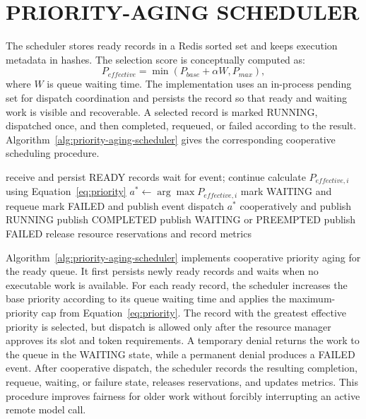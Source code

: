 \section{\uppercase{Priority-Aging Scheduler}}
The scheduler stores ready records in a Redis sorted set and keeps execution metadata in hashes. The selection score is conceptually computed as:
\begin{equation}
P_{effective}=\min(P_{base}+\alpha W,P_{max}),
\label{eq:priority}
\end{equation}
where $W$ is queue waiting time. The implementation uses an in-process pending set for dispatch coordination and persists the record so that ready and waiting work is visible and recoverable. A selected record is marked RUNNING, dispatched once, and then completed, requeued, or failed according to the result. Algorithm~\ref{alg:priority-aging-scheduler} gives the corresponding cooperative scheduling procedure.

\begin{algorithm}[H]
\caption{Global Priority-Aging Cooperative Scheduler}
\label{alg:priority-aging-scheduler}
\begin{algorithmic}[1]
\State receive and persist READY records
 wait for event; continue \EndIf
{} calculate $P_{effective,i}$ using Equation~\ref{eq:priority} \EndFor
\State $a^* \gets \arg\max P_{effective,i}$
 mark WAITING and requeue
 mark FAILED and publish event
\Else dispatch $a^*$ cooperatively and publish RUNNING
 publish COMPLETED
 publish WAITING or PREEMPTED
\Else publish FAILED
\EndIf
\EndIf
\State release resource reservations and record metrics
\EndWhile
\end{algorithmic}
\end{algorithm}
Algorithm~\ref{alg:priority-aging-scheduler} implements cooperative priority aging for the ready queue. It first persists newly ready records and waits when no executable work is available. For each ready record, the scheduler increases the base priority according to its queue waiting time and applies the maximum-priority cap from Equation~\ref{eq:priority}. The record with the greatest effective priority is selected, but dispatch is allowed only after the resource manager approves its slot and token requirements. A temporary denial returns the work to the queue in the WAITING state, while a permanent denial produces a FAILED event. After cooperative dispatch, the scheduler records the resulting completion, requeue, waiting, or failure state, releases reservations, and updates metrics. This procedure improves fairness for older work without forcibly interrupting an active remote model call.
